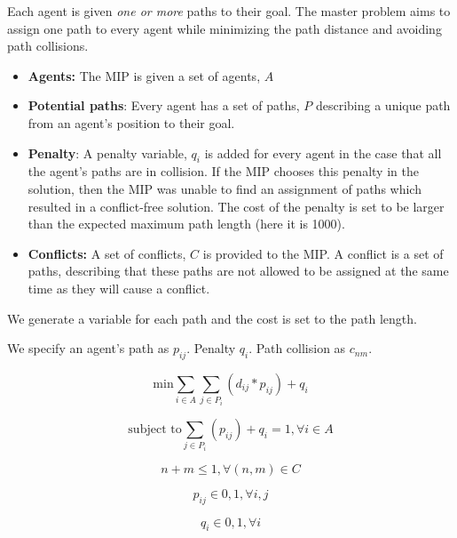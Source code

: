 \documentclass[a4paper,11pt]{article}
\begin{document}
Each agent is given \textit{one or more} paths to their goal. The master problem aims to assign one path to every agent while minimizing the path distance and avoiding path collisions. 

\begin{itemize}
	\item \textbf{Agents:} The MIP is given a set of agents, $A$
	\item \textbf{Potential paths}: Every agent has a set of paths, $P$ describing a unique path from an agent's position to their goal.
	\item \textbf{Penalty}: A penalty variable, $q_i$ is added for every agent in the case that all the agent's paths are in collision. If the MIP chooses this penalty in the solution, then the MIP was unable to find an assignment of paths which resulted in a conflict-free solution. The cost of the penalty is set to be larger than the expected maximum path length (here it is 1000).
	\item \textbf{Conflicts:} A set of conflicts, $C$ is provided to the MIP. A conflict is a set of paths, describing that these paths are not allowed to be assigned at the same time as they will cause a conflict. 
\end{itemize}

We generate a variable for each path and the cost is set to the path length.

We specify an agent's path as $p_{ij}$. Penalty $q_i$. Path collision as $c_{nm}$.



\begin{equation} \label{mas:min}
\text{min} \sum_{i \in A} \sum_{j \in P_i} (d_{ij} * p_{ij}) + q_i
\end{equation}

\begin{equation} \label{mas:pick} %
\text{subject to} \sum_{j \in P_i} (p_{ij}) + q_i = 1, \forall i \in A
\end{equation}

\begin{equation} \label{mas:conflict} %
n + m \le 1, \forall (n,m) \in C
\end{equation}

\begin{equation} \label{mas:path-one-or-zero} %
p_{ij} \in {0, 1}, \forall i, j
\end{equation}

\begin{equation} \label{mas:penalty} %
q_{i} \in {0, 1}, \forall i
\end{equation}
\end{document}
